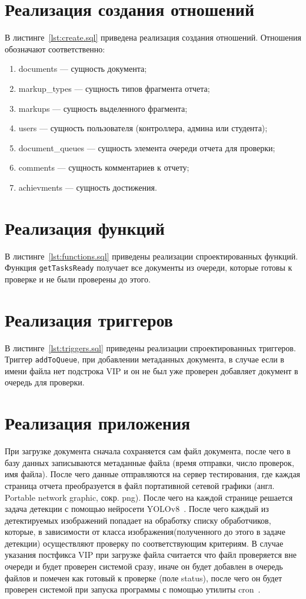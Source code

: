 \section{Реализация создания отношений}
В листинге~\ref{lst:create.sql} приведена реализация создания отношений.
Отношения обозначают соответственно:
\begin{enumerate}
	\item documents --- сущность документа;
	\item markup\_types --- сущность типов фрагмента отчета;
	\item markups --- сущность выделенного фрагмента;
	\item users --- сущность пользователя (контроллера, админа или студента);
	\item document\_queues --- сущность элемента очереди отчета для проверки;
	\item comments --- сущность комментариев к отчету;
	\item achievments --- сущность достижения.
\end{enumerate}


\section{Реализация функций}
В листинге~\ref{lst:functions.sql} приведены реализации спроектированных функций. Функция \texttt{getTasksReady} получает все документы из очереди, которые готовы к проверке и не были проверены до этого.

\section{Реализация триггеров}
В листинге~\ref{lst:triggers.sql} приведены реализации спроектированных триггеров. Триггер \texttt{addToQueue}, при добавлении метаданных документа, в случае если в имени файла нет подстрока VIP и он не был уже проверен добавляет документ в очередь для проверки.


\section{Реализация приложения}
При загрузке документа сначала сохраняется сам файл документа, после чего в базу данных записываются метаданные файла (время отправки, число проверок, имя файла). После чего данные отправляются на сервер тестирования, где каждая страница отчета преобразуется в файл портативной сетевой графики (англ.  Portable network graphic, сокр. png). После чего на каждой странице решается задача детекции с помощью нейросети YOLOv8~\cite{YOLOv8}. После чего каждый из детектируемых изображений попадает  на обработку списку обработчиков, которые,  в зависимости от класса изображения(полученного до этого в задаче детекции) осуществляют проверку по соответствующим критериям. В случае указания постфикса VIP при загрузке файла считается что файл проверяется вне очереди и будет проверен системой сразу, иначе он будет добавлен в очередь файлов и помечен как готовый к проверке (поле status), после чего он будет проверен системой при запуска программы с помощью утилиты cron~\cite{cron}.

